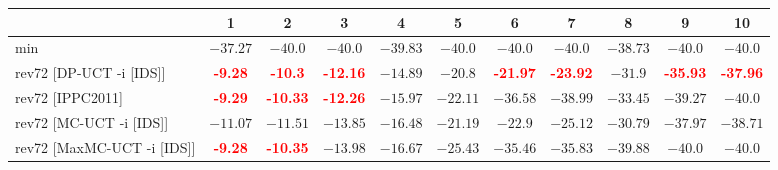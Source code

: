 \documentclass{article}
\begin{document}
\begin{tabular}{|l|r@{$\pm$}rr@{$\pm$}rr@{$\pm$}rr@{$\pm$}rr@{$\pm$}rr@{$\pm$}rr@{$\pm$}rr@{$\pm$}rr@{$\pm$}rr@{$\pm$}r|}
\hline

& \multicolumn{2}{c}{1}
& \multicolumn{2}{c}{2}
& \multicolumn{2}{c}{3}
& \multicolumn{2}{c}{4}
& \multicolumn{2}{c}{5}
& \multicolumn{2}{c}{6}
& \multicolumn{2}{c}{7}
& \multicolumn{2}{c}{8}
& \multicolumn{2}{c}{9}
& \multicolumn{2}{c|}{10}
\\
\hline
\hline
min
& \multicolumn{2}{c}{$-37.27$}
& \multicolumn{2}{c}{$-40.0$}
& \multicolumn{2}{c}{$-40.0$}
& \multicolumn{2}{c}{$-39.83$}
& \multicolumn{2}{c}{$-40.0$}
& \multicolumn{2}{c}{$-40.0$}
& \multicolumn{2}{c}{$-40.0$}
& \multicolumn{2}{c}{$-38.73$}
& \multicolumn{2}{c}{$-40.0$}
& \multicolumn{2}{c|}{$-40.0$}
\\
rev72 [DP-UCT -i [IDS]]
& \multicolumn{2}{c}{\textbf{\textcolor{red}{-9.28}}}
& \multicolumn{2}{c}{\textbf{\textcolor{red}{-10.3}}}
& \multicolumn{2}{c}{\textbf{\textcolor{red}{-12.16}}}
& \multicolumn{2}{c}{$-14.89$}
& \multicolumn{2}{c}{$-20.8$}
& \multicolumn{2}{c}{\textbf{\textcolor{red}{-21.97}}}
& \multicolumn{2}{c}{\textbf{\textcolor{red}{-23.92}}}
& \multicolumn{2}{c}{$-31.9$}
& \multicolumn{2}{c}{\textbf{\textcolor{red}{-35.93}}}
& \multicolumn{2}{c|}{\textbf{\textcolor{red}{-37.96}}}
\\
rev72 [IPPC2011]
& \multicolumn{2}{c}{\textbf{\textcolor{red}{-9.29}}}
& \multicolumn{2}{c}{\textbf{\textcolor{red}{-10.33}}}
& \multicolumn{2}{c}{\textbf{\textcolor{red}{-12.26}}}
& \multicolumn{2}{c}{$-15.97$}
& \multicolumn{2}{c}{$-22.11$}
& \multicolumn{2}{c}{$-36.58$}
& \multicolumn{2}{c}{$-38.99$}
& \multicolumn{2}{c}{$-33.45$}
& \multicolumn{2}{c}{$-39.27$}
& \multicolumn{2}{c|}{$-40.0$}
\\
rev72 [MC-UCT -i [IDS]]
& \multicolumn{2}{c}{$-11.07$}
& \multicolumn{2}{c}{$-11.51$}
& \multicolumn{2}{c}{$-13.85$}
& \multicolumn{2}{c}{$-16.48$}
& \multicolumn{2}{c}{$-21.19$}
& \multicolumn{2}{c}{$-22.9$}
& \multicolumn{2}{c}{$-25.12$}
& \multicolumn{2}{c}{$-30.79$}
& \multicolumn{2}{c}{$-37.97$}
& \multicolumn{2}{c|}{$-38.71$}
\\
rev72 [MaxMC-UCT -i [IDS]]
& \multicolumn{2}{c}{\textbf{\textcolor{red}{-9.28}}}
& \multicolumn{2}{c}{\textbf{\textcolor{red}{-10.35}}}
& \multicolumn{2}{c}{$-13.98$}
& \multicolumn{2}{c}{$-16.67$}
& \multicolumn{2}{c}{$-25.43$}
& \multicolumn{2}{c}{$-35.46$}
& \multicolumn{2}{c}{$-35.83$}
& \multicolumn{2}{c}{$-39.88$}
& \multicolumn{2}{c}{$-40.0$}
& \multicolumn{2}{c|}{$-40.0$}

\end{tabular}
\end{document}
